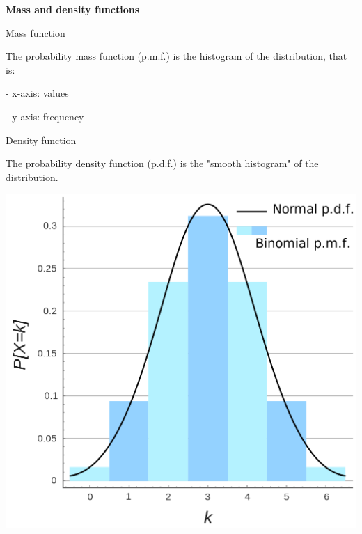 {\fontsize{12pt}{22pt} \textbf{Mass and density functions}\par}

\vspace{5mm}

Mass function

The probability mass function (p.m.f.) is the histogram of the distribution, that is:

- x-axis: values

- y-axis: frequency

\vspace{5mm}

Density function

The probability density function (p.d.f.) is the "smooth histogram" of the distribution.

\vspace{5mm}

\begin{center}
\includegraphics[scale=0.15]{mass_density_functions.png}
\end{center}

\vspace{5mm}